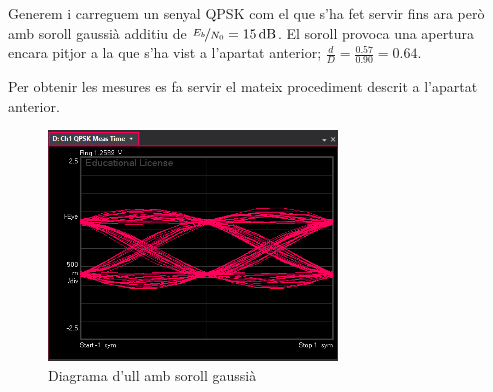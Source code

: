 \documentclass[catalan, a4paper, nobib]{tufte-handout}
\begin{document}
Generem i carreguem un senyal QPSK com el que s'ha fet servir fins ara però amb soroll gaussià additiu de $\nicefrac{E_b}{N_0}=\qty{15}{\deci\bel}$. El soroll provoca una apertura encara pitjor a la que s'ha vist a l'apartat anterior; $\frac{d}{D}=\frac{\num{0.57}}{\num{0.90}}=\num{0.64}.$

Per obtenir les mesures es fa servir el mateix procediment descrit a l'apartat anterior.

\begin{figure}
    \begin{center}
        \includegraphics[width=290px]{p6.png}
    \end{center}
    \caption{Diagrama d'ull amb soroll gaussià}
\end{figure}
\end{document}
